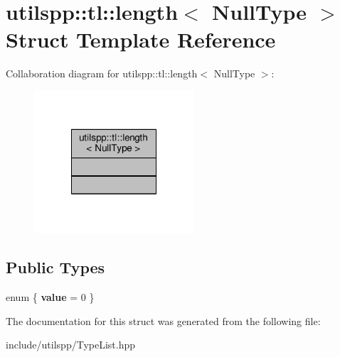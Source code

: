\hypertarget{structutilspp_1_1tl_1_1length_3_01NullType_01_4}{\section{utilspp\-:\-:tl\-:\-:length$<$ Null\-Type $>$ Struct Template Reference}
\label{structutilspp_1_1tl_1_1length_3_01NullType_01_4}
}


Collaboration diagram for utilspp\-:\-:tl\-:\-:length$<$ Null\-Type $>$\-:\nopagebreak
\begin{figure}[H]
\begin{center}
\leavevmode
\includegraphics[width=168pt]{structutilspp_1_1tl_1_1length_3_01NullType_01_4__coll__graph}
\end{center}
\end{figure}
\subsection*{Public Types}
\begin{DoxyCompactItemize}
\item 
enum \{ {\bfseries value} = 0
 \}
\end{DoxyCompactItemize}


The documentation for this struct was generated from the following file\-:\begin{DoxyCompactItemize}
\item 
include/utilspp/Type\-List.\-hpp\end{DoxyCompactItemize}
